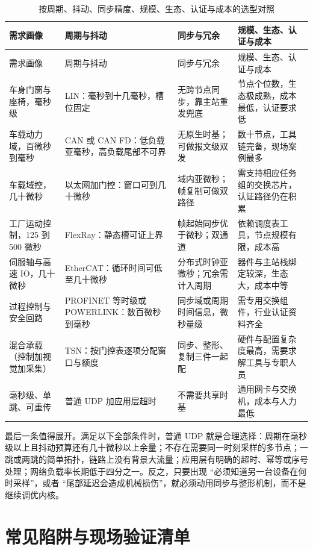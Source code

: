 \documentclass[12pt,a4paper,fontset=fandol]{ctexbook}
\begin{document}
\begin{longtable}{>{\raggedright\arraybackslash}p{} >{\raggedright\arraybackslash}p{} >{\raggedright\arraybackslash}p{} >{\raggedright\arraybackslash}p{}}
\caption{按周期、抖动、同步精度、规模、生态、认证与成本的选型对照}\label{tab:ch12-selection}\\
\toprule
需求画像 & 周期与抖动 & 同步与冗余 & 规模、生态、认证与成本 \\
\midrule
\endfirsthead
\toprule
需求画像 & 周期与抖动 & 同步与冗余 & 规模、生态、认证与成本 \\
\midrule
\endhead
\bottomrule
\endfoot
\endlastfoot
车身门窗与座椅，毫秒级 & LIN：毫秒到十几毫秒，槽位固定 & 无跨节点同步，靠主站重发兜底 & 节点个位数，生态极成熟，成本最低，认证要求低 \\
车载动力域，百微秒到毫秒 & CAN 或 CAN FD：低负载亚毫秒，高负载尾部不可界 & 无原生时基；可做报文级双发 & 数十节点，工具链完备，现场案例最多 \\
车载域控，几十微秒 & 以太网加门控：窗口可到几十微秒 & 域内亚微秒；帧复制可做双路径 & 需支持相应任务组的交换芯片，认证路径仍在积累 \\
工厂运动控制，125 到 500 微秒 & FlexRay：静态槽可证上界 & 帧起始同步优于微秒；双通道 & 依赖调度表工具，节点规模有限，成本高 \\
伺服轴与高速 IO，几十微秒 & EtherCAT：循环时间可低至几十微秒 & 分布式时钟亚微秒；冗余需计入周期 & 器件与主站栈绑定较深，生态大，成本中等 \\
过程控制与安全回路 & PROFINET 等时级或 POWERLINK：数百微秒到毫秒 & 同步域或周期时间信息，微秒量级 & 需专用交换组件，行业认证资料齐全 \\
混合承载（控制加视觉加采集） & TSN：按门控表逐项分配窗口与额度 & 同步、整形、复制三件一起配 & 硬件与配置复杂度最高，需要求解工具与专职人员 \\
毫秒级、单跳、可重传 & 普通 UDP 加应用层超时 & 不需要共享时基 & 通用网卡与交换机，成本与人力最低 \\
\end{longtable}

最后一条值得展开。满足以下全部条件时，普通 UDP 就是合理选择：周期在毫秒级以上且抖动预算还有几十微秒以上余量；不存在需要同一时刻采样的多节点；一跳或两跳的简单拓扑，链路上没有背景大流量；应用层有明确的超时、幂等或序号处理；网络负载率长期低于四分之一。反之，只要出现 ``必须知道另一台设备在何时采样''，或者 ``尾部延迟会造成机械损伤''，就必须动用同步与整形机制，而不是继续调优内核。

\section{常见陷阱与现场验证清单}
\end{document}
